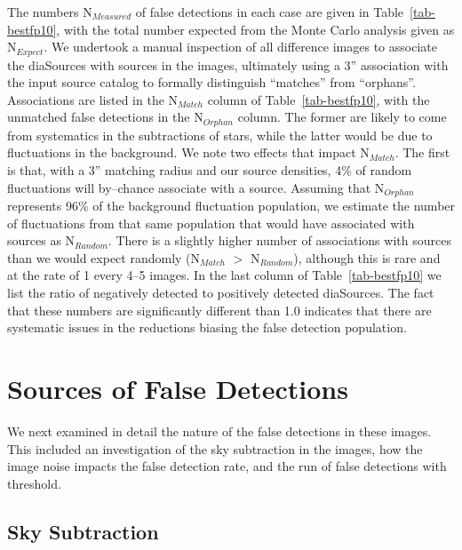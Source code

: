 \documentclass[iop]{emulateapj}
\begin{document}
The numbers N$_{Measured}$ of false detections in each case are given in Table~\ref{tab-bestfp10}, with the total number expected from the Monte Carlo analysis given as N$_{Expect}$.
We undertook a manual inspection of all difference images to associate the diaSources with sources in the images, ultimately using a 3'' association with the input source catalog to formally distinguish ``matches'' from ``orphans''.
Associations are listed in the N$_{Match}$ column of Table~\ref{tab-bestfp10}, with the unmatched false detections in the N$_{Orphan}$ column.
The former are likely to come from systematics in the subtractions of stars, while the latter would be due to fluctuations in the background.
We note two effects that impact N$_{Match}$.
The first is that, with a 3'' matching radius and our source densities, 4\% of random fluctuations will by--chance associate with a source.
Assuming that N$_{Orphan}$ represents 96\% of the background fluctuation population, we estimate the number of fluctuations from that same population that would have associated with sources as N$_{Random}$.
There is a slightly higher number of associations with sources than we would expect randomly (N$_{Match}$ $>$ N$_{Random}$), although this is rare and at the rate of 1 every 4--5 images.
In the last column of Table~\ref{tab-bestfp10} we list the ratio of negatively detected to positively detected diaSources.
The fact that these numbers are significantly different than 1.0 indicates that there are systematic issues in the reductions biasing the false detection population.

\section{Sources of False Detections}
We next examined in detail the nature of the false detections in these images.
This included an investigation of the sky subtraction in the images, how the image noise impacts the false detection rate, and the run of false detections with threshold.

\subsection{Sky Subtraction}
\end{document}
